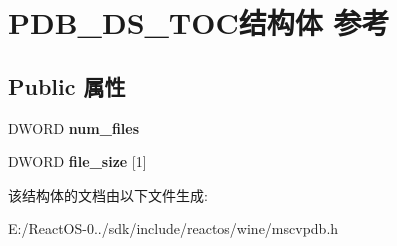 \hypertarget{struct_p_d_b___d_s___t_o_c}{}\section{P\+D\+B\+\_\+\+D\+S\+\_\+\+T\+O\+C结构体 参考}
\label{struct_p_d_b___d_s___t_o_c}
\subsection*{Public 属性}
\begin{DoxyCompactItemize}
\item 
\mbox{\label{struct_p_d_b___d_s___t_o_c_af4cbd425af174dcd51d5e8928fcd50c9}} 
D\+W\+O\+RD {\bfseries num\+\_\+files}
\item 
\mbox{\label{struct_p_d_b___d_s___t_o_c_a0195329d9fa3881e13a439adb024aa29}} 
D\+W\+O\+RD {\bfseries file\+\_\+size} \mbox{[}1\mbox{]}
\end{DoxyCompactItemize}


该结构体的文档由以下文件生成\+:\begin{DoxyCompactItemize}
\item 
E\+:/\+React\+O\+S-\/0../sdk/include/reactos/wine/mscvpdb.\+h\end{DoxyCompactItemize}
